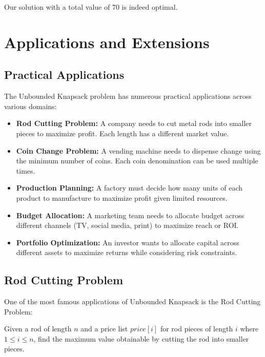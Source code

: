 \documentclass{article}
\begin{document}
Our solution with a total value of 70 is indeed optimal.

\section{Applications and Extensions}

\subsection{Practical Applications}

The Unbounded Knapsack problem has numerous practical applications across various domains:

\begin{tcolorbox}[notebox, title=Real-World Applications]
\begin{itemize}[leftmargin=*]
    \item \textbf{Rod Cutting Problem:} A company needs to cut metal rods into smaller pieces to maximize profit. Each length has a different market value.
    
    \item \textbf{Coin Change Problem:} A vending machine needs to dispense change using the minimum number of coins. Each coin denomination can be used multiple times.
    
    \item \textbf{Production Planning:} A factory must decide how many units of each product to manufacture to maximize profit given limited resources.
    
    \item \textbf{Budget Allocation:} A marketing team needs to allocate budget across different channels (TV, social media, print) to maximize reach or ROI.
    
    \item \textbf{Portfolio Optimization:} An investor wants to allocate capital across different assets to maximize returns while considering risk constraints.
\end{itemize}
\end{tcolorbox}

\subsection{Rod Cutting Problem}

One of the most famous applications of Unbounded Knapsack is the Rod Cutting Problem:

\begin{tcolorbox}[examplebox, title=Rod Cutting Problem]
Given a rod of length $n$ and a price list $price[i]$ for rod pieces of length $i$ where $1 \leq i \leq n$, find the maximum value obtainable by cutting the rod into smaller pieces.
\end{tcolorbox}
\end{document}
